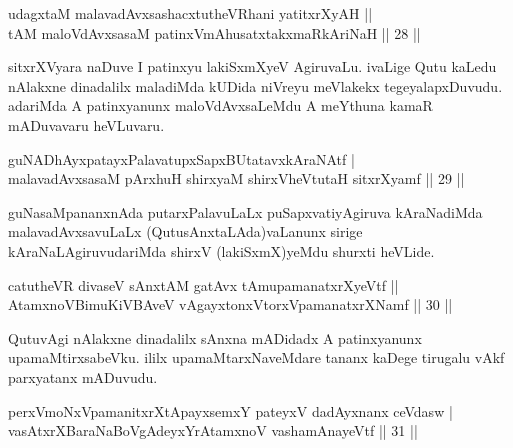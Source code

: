 
\begin{shl}
udagxtaM malavadAvxsashacxtutheVR\s hani yatitxrXyAH || \\
tAM maloVdAvxsasaM patinxVmAhusatxtakxmaRkAriNaH \hfill|| 28 || 
\end{shl}

\begin{artha}
sitxrXVyara naDuve I patinxyu lakiSxmXyeV AgiruvaLu. ivaLige Qutu 
kaLedu nAlakxne dinadalilx maladiMda kUDida niVreyu meVlakekx 
tegeyalapxDuvudu. adariMda A patinxyanunx maloVdAvxsaLeMdu A meYthuna 
kamaR mADuvavaru heVLuvaru.
\end{artha}


\begin{shl}
guNADhAyxpatayxPalavatupxSapxBUtatavxkAraNAtf | \\
malavadAvxsasaM pArxhuH shirxyaM shirxVheVtutaH sitxrXyamf \hfill|| 29 || 
\end{shl}

\begin{artha}
guNasaMpananxnAda putarxPalavuLaLx puSapxvatiyAgiruva kAraNadiMda malavadAvxsavuLaLx (QutusAnxtaLAda)vaLanunx sirige kAraNaLAgiruvudariMda shirxV (lakiSxmX)yeMdu shurxti heVLide.
\end{artha}


\begin{shl}
catutheVR divaseV sAnxtAM gatAvx tAmupamanatxrXyeVtf || \\
AtamxnoV\s BimuKiVBAveV vAgayxtonxV\s torxVpamanatxrXNamf \hfill|| 30 || 
\end{shl}

\begin{artha}
QutuvAgi nAlakxne dinadalilx sAnxna mADidadx A patinxyanunx upamaMtirxsabeVku. ililx upamaMtarxNaveMdare tananx kaDege tirugalu vAkf parxyatanx mADuvudu.
\end{artha}

\begin{shl}
perxVmoNxVpamanitxrXtA\s payxsemxY pateyxV dadAyxnanx ceVdasw | \\
vasAtxrXBaraNaBoVgAdeyxYrAtamxnoV vashamAnayeVtf \hfill|| 31 ||  
\end{shl}

